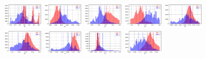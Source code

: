 \documentclass[11pt]{article}
\begin{document}
\begin{figure}[H]
  \centering
  \includegraphics[width=0.18\textwidth]{../code/Task3/Analysis/Hist-V1.jpg}
  \includegraphics[width=0.18\textwidth]{../code/Task3/Analysis/Hist-V2.jpg}
  \includegraphics[width=0.18\textwidth]{../code/Task3/Analysis/Hist-V3.jpg}
  \includegraphics[width=0.18\textwidth]{../code/Task3/Analysis/Hist-V4.jpg}
  \includegraphics[width=0.18\textwidth]{../code/Task3/Analysis/Hist-V5.jpg} \\
  \includegraphics[width=0.18\textwidth]{../code/Task3/Analysis/Hist-V6.jpg}
  \includegraphics[width=0.18\textwidth]{../code/Task3/Analysis/Hist-V7.jpg}
  \includegraphics[width=0.18\textwidth]{../code/Task3/Analysis/Hist-V8.jpg}
  \includegraphics[width=0.18\textwidth]{../code/Task3/Analysis/Hist-V9.jpg}

\end{figure}
\end{document}
